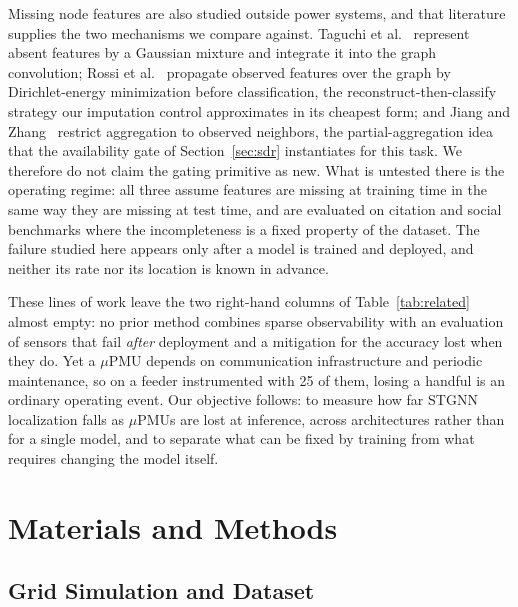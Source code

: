 \documentclass[3p,times,procedia]{elsarticle}
\begin{document}
Missing node features are also studied outside power systems, and that literature supplies the two mechanisms we compare against. Taguchi et al.~\cite{taguchi2021} represent absent features by a Gaussian mixture and integrate it into the graph convolution; Rossi et al.~\cite{rossi2022} propagate observed features over the graph by Dirichlet-energy minimization before classification, the reconstruct-then-classify strategy our imputation control approximates in its cheapest form; and Jiang and Zhang~\cite{jiang2020} restrict aggregation to observed neighbors, the partial-aggregation idea that the availability gate of Section~\ref{sec:sdr} instantiates for this task. We therefore do not claim the gating primitive as new. What is untested there is the operating regime: all three assume features are missing at training time in the same way they are missing at test time, and are evaluated on citation and social benchmarks where the incompleteness is a fixed property of the dataset. The failure studied here appears only after a model is trained and deployed, and neither its rate nor its location is known in advance.

These lines of work leave the two right-hand columns of Table~\ref{tab:related} almost empty: no prior method combines sparse observability with an evaluation of sensors that fail \emph{after} deployment and a mitigation for the accuracy lost when they do. Yet a $\mu$PMU depends on communication infrastructure and periodic maintenance, so on a feeder instrumented with 25 of them, losing a handful is an ordinary operating event. Our objective follows: to measure how far STGNN localization falls as $\mu$PMUs are lost at inference, across architectures rather than for a single model, and to separate what can be fixed by training from what requires changing the model itself.

\section{Materials and Methods}
\label{sec:methods}

\subsection{Grid Simulation and Dataset}
\label{sec:dataset}
\end{document}
